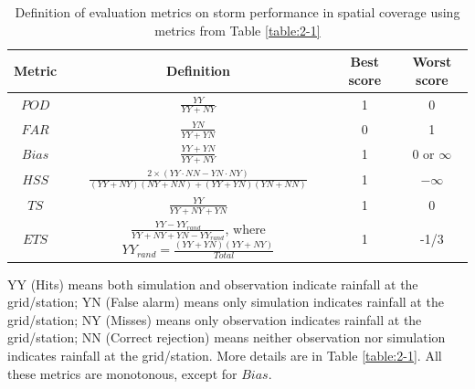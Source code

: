 \begin{table}[htbp]
	\centering
	\caption{Definition of evaluation metrics on storm performance in spatial coverage using metrics from Table \ref{table:2-1}}
	\begin{threeparttable}
		\begin{tabular}{cccc}
			\hline
			Metric  &  Definition   &  Best score   &  Worst score\\
			\hline
			$POD$   &  $\frac{{YY}}{{YY + NY}}$  & 1    & 0\\
			\hline
			$FAR$   &  $\frac{YN}{YY+YN}$        & 0    & 1\\
			\hline
			$Bias$  &  $\frac{YY+YN}{YY+NY}$     & 1    & 0 or $\infty$\\
			\hline
			$HSS$   & $\frac{{2 \times (YY \cdot NN - YN \cdot NY)}}{{(YY + NY)(NY + NN) + (YY + YN)(YN + NN)}}$   &  1    & $-\infty$\\
			\hline
			$TS$    &  $\frac{{YY}}{{YY + NY + YN}}$   &  1    & 0\\
			\hline
			$ETS$   &  $\frac{{YY - Y{Y_{rand}}}}{{YY + NY + YN - Y{Y_{rand}}}}$, where $Y{Y_{rand}} = \frac{{(YY + YN)(YY + NY)}}{{Total}}$   &  1   & -1/3\\
			\hline
		\end{tabular}
		\begin{tablenotes}
			\small
			\item YY (Hits) means both simulation and observation indicate rainfall at the grid/station; YN (False alarm) means only simulation indicates rainfall at the grid/station; NY (Misses) means only observation indicates rainfall at the grid/station; NN (Correct rejection) means neither observation nor simulation indicates rainfall at the grid/station. More details are in Table \ref{table:2-1}. All these metrics are monotonous, except for $Bias$.
		\end{tablenotes}
	\end{threeparttable}
	\label{table:2-2}
\end{table}


